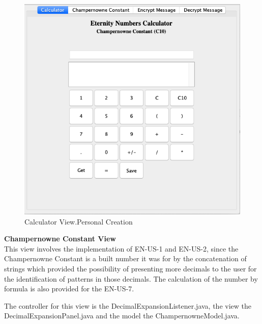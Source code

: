 \documentclass{report}
\begin{document}
\begin{figure}[H]
\centering
\includegraphics[scale=0.5]{images/CalculatorView.png}
\caption[Calculator View]{Calculator View.Personal Creation}
\end{figure}

\textbf{Champernowne Constant View} \\

This view involves the implementation of EN-US-1 and EN-US-2, since the Champernowne Constant is a built number it was for by the concatenation of strings which provided the possibility of presenting more decimals to the user for the identification of patterns in those decimals. The calculation of the number by formula is also provided for the EN-US-7.

The controller for this view is the DecimalExpansionListener.java, the view the DecimalExpansionPanel.java and the model the ChampernowneModel.java.
\end{document}
